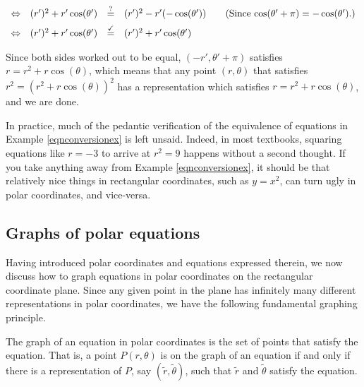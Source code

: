 \begin{example}
\begin{enumerate}
\begin{enumerate}
\[\begin{array}{rrclr}
\Leftrightarrow&(r')^2 + r'\cos(\theta') & \stackrel{\text{?}}{=}  & (r')^2 - r' (- \cos(\theta')) & \quad\text{(Since $\cos(\theta' + \pi) = -\cos(\theta')$.)} \\[5pt]

\Leftrightarrow&(r')^2 + r'\cos(\theta') & \stackrel{\text{\checkmark}}{=}  & (r')^2 + r' \cos(\theta') & \\

\end{array} \]

Since both sides worked out to be equal, $(-r', \theta' + \pi)$ satisfies $r = r^2 + r\cos(\theta)$, which means that any point $(r,\theta)$ that satisfies $r^2 = \left(r^2 + r\cos(\theta)\right)^2$ has a representation which satisfies  $r = r^2 + r\cos(\theta)$, and we are done.


\end{enumerate}

\end{enumerate}
\end{example}

In practice, much of the pedantic verification of the equivalence of equations in Example \ref{eqnconversionex} is left unsaid.  Indeed, in most textbooks, squaring equations like $r=-3$ to arrive at $r^2=9$ happens without a second thought. If you take anything away from Example \ref{eqnconversionex}, it should be that relatively nice things in rectangular coordinates, such as $y = x^2$, can turn ugly in polar coordinates, and vice-versa.


\subsection{Graphs of polar equations}

Having introduced polar coordinates and equations expressed therein, we now discuss how to graph equations in polar coordinates on the rectangular coordinate plane.  Since any given point in the plane has infinitely many different representations in polar coordinates, we have the following fundamental graphing principle.

\begin{definition}
\label{fgpp}

The graph of an equation in polar coordinates is the set of points that satisfy the equation.  That is, a point $P(r,\theta)$ is on the graph of an equation if and only if there is a representation of $P$, say $\left(\widetilde{r},\widetilde{\theta}\right)$, such that $\widetilde{r}$ and $\widetilde{\theta}$ satisfy the equation.

\end{definition}

